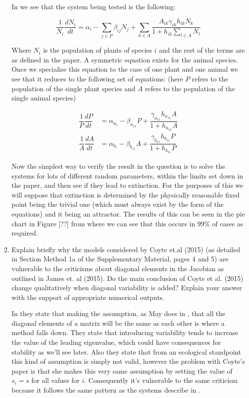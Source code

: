 \documentclass[11pt]{scrreprt}
\begin{document}
\begin{enumerate}
		In \citet{James2012} we see that the system being tested is the following:
		
		$$
		\dfrac{1}{N_i} \dfrac{dN_i}{dt} = \alpha_i - \sum_{j \in P} \beta_{ij}N_j + \sum_{k \in A} \dfrac{A_{ik}\gamma_{ik}h_{ik}N_{k}}{1 + h_{ik}\sum_{l \in A}N_l}
		$$
		
		Where $N_i$ is the population of plants of species $i$ and the rest of the terms are as defined in the paper. A symmetric equation exists for the animal species. Once we specialise this equation to the case of one plant and one animal we see that it reduces to the following set of equations: (here $P$ refers to the population of the single plant species and $A$ refers to the population of the single animal species)
		
		\begin{align*}
		\dfrac{1}{P}\dfrac{dP}{dt} & = \alpha_{a_1} - \beta_{a_{11}}P + \dfrac{\gamma_{a_{11}}h_{a_{11}}A}{1 + h_{a_{11}}A} \\
		\dfrac{1}{A}\dfrac{dA}{dt} & = \alpha_{b_1} - \beta_{b_{11}}A + \dfrac{\gamma_{b_{11}}h_{b_{11}}P}{1 + h_{b_{11}}P} 
		\end{align*}
		
		Now the simplest way to verify the result in the question is to solve the systems for lots of different random parameters, within the limits set down in the paper, and then see if they lead to extinction. For the purposes of this we will suppose that extinction is determined by the physically reasonable fixed point being the trivial one (which must always exist by the form of the equations) and it being an attractor. The results of this can be seen in the pie chart in Figure [??] from where we can see that this occurs in 99\% of cases as required.
		
		\newpage
		
		\item Explain briefly why the models considered by Coyte et.al (2015) (as detailed in Section Method 1a of the Supplementary Material, pages 4 and 5) are vulnerable to the criticisms about diagonal elements in the Jacobian as outlined in James et. al (2015). Do the main conclusion of Coyte et al. (2015) change qualitatively when diagonal variability is added? Explain your answer with the support of appropriate numerical outputs.
		
		In \citet{James2015} they state that making the assumption, as May does in \cite{May1972}, that all the diagonal elements of a matrix will be the same as each other is where a method falls down. They state that introducing variability tends to increase the value of the leading eigenvalue, which could have consequences for stability as we'll see later. Also they state that from an ecological standpoint this kind of assumption is simply not valid, however the problem with Coyte's paper is that she makes this very same assumption by setting the value of $s_i = s$ for all values for $i$. Consequently it's vulnerable to the same criticism because it follows the same pattern as the systems describe in \citet{James2015}. 
		

\end{enumerate}
\end{document}
